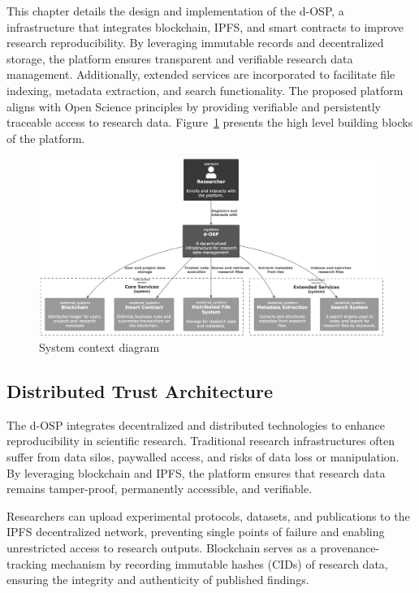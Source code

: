 \documentclass[final]{rc-book-2.14}
\begin{document}
This chapter details the design and implementation of the d-OSP, a infrastructure that integrates blockchain, IPFS, and smart contracts to improve research reproducibility. By leveraging immutable records and decentralized storage, the platform ensures transparent and verifiable research data management. Additionally, extended services are incorporated to facilitate file indexing, metadata extraction, and search functionality. The proposed platform aligns with Open Science principles by providing verifiable and persistently traceable access to research data. Figure~\ref{fig:c4_context_diagram} presents the high level building blocks of the platform.


\begin{figure}[htbp]
    \centering
    \includegraphics[scale=0.30]{fig/c4_context_diagram.eps}
    \caption{System context diagram}
    \label{fig:c4_context_diagram}
\end{figure}

\subsection{Distributed Trust Architecture}

The d-OSP integrates decentralized and distributed technologies to enhance reproducibility in scientific research. Traditional research infrastructures often suffer from data silos, paywalled access, and risks of data loss or manipulation. By leveraging blockchain and IPFS, the platform ensures that research data remains tamper-proof, permanently accessible, and verifiable.

Researchers can upload experimental protocols, datasets, and publications to the IPFS decentralized network, preventing single points of failure and enabling unrestricted access to research outputs. Blockchain serves as a provenance-tracking mechanism by recording immutable hashes (CIDs) of research data, ensuring the integrity and authenticity of published findings.
\end{document}
